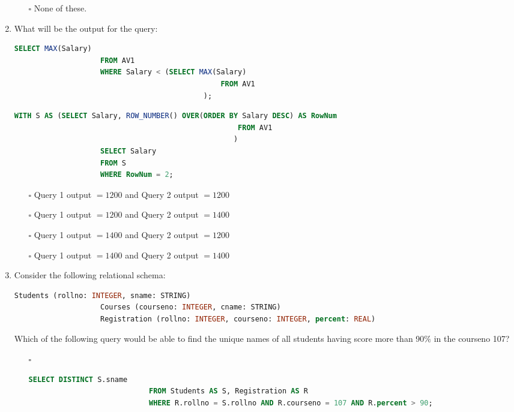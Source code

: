 \documentclass[10pt]{article}
\begin{document}
\begin{enumerate}
\begin{enumerate}
					\item[$\square$] None of these.
				\end{enumerate}

			\item What will be the output for the query:
				\begin{lstlisting}[language=SQL,firstline=1, lastline=6] 
					SELECT MAX(Salary) 
					FROM AV1 
					WHERE Salary < (SELECT MAX(Salary) 
									            FROM AV1 
								            );
				\end{lstlisting}
				\begin{lstlisting}[language=SQL,firstline=1, lastline=6] 
					WITH S AS (SELECT Salary, ROW_NUMBER() OVER(ORDER BY Salary DESC) AS RowNum 
												    FROM AV1
												   ) 
					SELECT Salary 
					FROM S 
					WHERE RowNum = 2;
				\end{lstlisting}
				\begin{enumerate}
					\item[$\square$] Query 1 output $= 1200$ and Query 2 output $= 1200$
					\item[$\square$] Query 1 output $= 1200$ and Query 2 output $= 1400$
					\item[$\square$] Query 1 output $= 1400$ and Query 2 output $= 1200$
					\item[$\square$] Query 1 output $= 1400$ and Query 2 output $= 1400$
				\end{enumerate}

			\newpage

			\item Consider the following relational schema:
				\begin{lstlisting}[language=SQL,firstline=1, lastline=3] 
					Students (rollno: INTEGER, sname: STRING)
					Courses (courseno: INTEGER, cname: STRING)
					Registration (rollno: INTEGER, courseno: INTEGER, percent: REAL)
				\end{lstlisting}
				Which of the following query would be able to find the unique names of all students having score more than 90$\%$ in the courseno 107?
				\begin{enumerate}
					\item[$\square$] 
						\begin{lstlisting}[language=SQL,firstline=1, lastline=3, numbers = right] 
							SELECT DISTINCT S.sname 
							FROM Students AS S, Registration AS R 
							WHERE R.rollno = S.rollno AND R.courseno = 107 AND R.percent > 90;
						\end{lstlisting}
						

\end{enumerate}
\end{enumerate}
\end{document}
